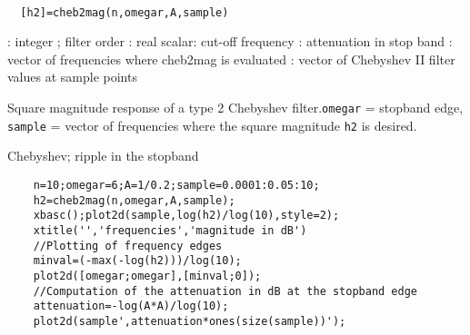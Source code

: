 
\begin{mandesc}
   \\ %
\end{mandesc}
\begin{calling_sequence}
\begin{verbatim}
  [h2]=cheb2mag(n,omegar,A,sample)  
\end{verbatim}
\end{calling_sequence}
\begin{parameters}
  \begin{varlist}
    : integer ; filter order
    : real scalar: cut-off frequency
    : attenuation in stop band
    : vector of frequencies where cheb2mag is evaluated
    : vector of Chebyshev II filter values at sample points
  \end{varlist}
\end{parameters}
\begin{mandescription}
  Square magnitude response of a type 2 Chebyshev filter.\verb!omegar! = stopband edge, \verb!sample! = vector of 
  frequencies where the square magnitude \verb!h2! is desired.
\end{mandescription}
\begin{examples}
  Chebyshev; ripple in the stopband
  \begin{Verbatim}
    n=10;omegar=6;A=1/0.2;sample=0.0001:0.05:10;
    h2=cheb2mag(n,omegar,A,sample);
    xbasc();plot2d(sample,log(h2)/log(10),style=2);
    xtitle('','frequencies','magnitude in dB')
    //Plotting of frequency edges
    minval=(-max(-log(h2)))/log(10);
    plot2d([omegar;omegar],[minval;0]);
    //Computation of the attenuation in dB at the stopband edge
    attenuation=-log(A*A)/log(10);
    plot2d(sample',attenuation*ones(size(sample))');
  \end{Verbatim}
\end{examples}
\begin{manseealso}
\end{manseealso}
